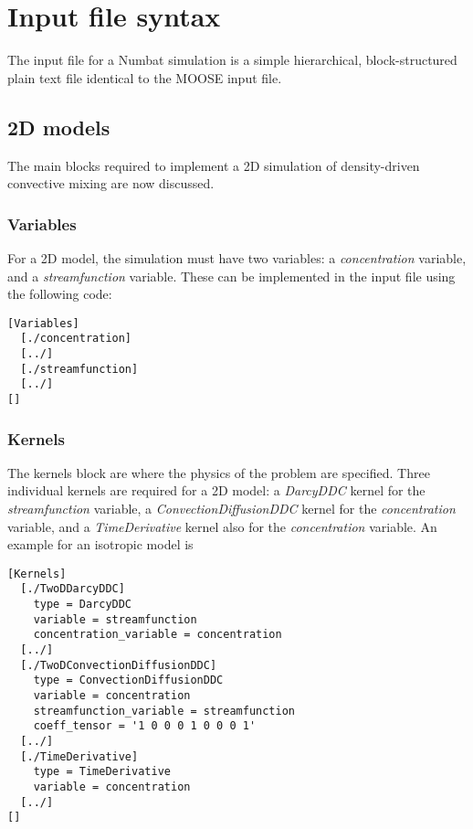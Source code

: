 \documentclass[11pt, a4paper]{csiroreport2012}
\begin{document}
\section{Input file syntax}

The input file for a Numbat simulation is a simple hierarchical, block-structured plain text file identical to the MOOSE input file. 

\subsection{2D models}

The main blocks required to implement a 2D simulation of density-driven convective mixing are now discussed.
\subsubsection*{Variables}

For a 2D model, the simulation must have two variables: a \emph{concentration} variable, and a \emph{streamfunction} variable. These can be implemented in the input file using the following code:

\begin{verbatim}
[Variables]  
  [./concentration]  
  [../]  
  [./streamfunction]  
  [../]  
[]
\end{verbatim}

\subsubsection*{Kernels}

The kernels block are where the physics of the problem are specified. Three individual kernels are required for a 2D model: a \emph{DarcyDDC} kernel for the \emph{streamfunction} variable, a \emph{ConvectionDiffusionDDC} kernel for the \emph{concentration} variable, and a \emph{TimeDerivative} kernel also for the \emph{concentration} variable. An example for an isotropic model is

\begin{verbatim}
[Kernels]
  [./TwoDDarcyDDC]
    type = DarcyDDC
    variable = streamfunction
    concentration_variable = concentration
  [../]
  [./TwoDConvectionDiffusionDDC]
    type = ConvectionDiffusionDDC
    variable = concentration
    streamfunction_variable = streamfunction
    coeff_tensor = '1 0 0 0 1 0 0 0 1'
  [../]
  [./TimeDerivative]
    type = TimeDerivative
    variable = concentration
  [../]
[]
\end{verbatim}
\end{document}
